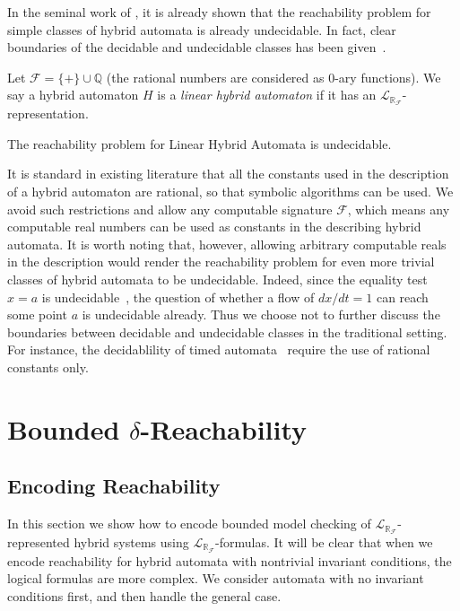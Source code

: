 \documentclass[envcountsect]{llncs}
\newcommand{\lrf}{\mathcal{L}_{\mathbb{R}_{\mathcal{F}}}}
\begin{document}
In the seminal work of \cite{DBLP:conf/rex/AlurD91,DBLP:conf/hybrid/AlurCHH92},
it is already shown that the reachability problem for simple classes of hybrid
automata is already undecidable. In fact, clear boundaries of the decidable and
undecidable classes has been given~\cite{DBLP:journals/jcss/HenzingerKPV98}.
\begin{definition}
Let $\mathcal{F} = \{+\}\cup \mathbb{Q}$ (the rational numbers are considered as
 0-ary functions). We say a hybrid automaton $H$ is a {\em linear hybrid
automaton} if it has an $\lrf$-representation.
\end{definition}

\begin{proposition}
The reachability problem for Linear Hybrid Automata is undecidable.
\end{proposition}
\begin{remark}
It is standard in existing literature that all the constants used in the
description of a hybrid automaton are rational, so that symbolic algorithms can
be used. We avoid such restrictions and allow any
computable signature $\mathcal{F}$, which means  any computable real numbers
can be used as constants in the describing hybrid automata. It is worth noting
that, however, allowing arbitrary computable reals in the description would
render the reachability problem for even more trivial classes of hybrid automata
to be undecidable. Indeed, since the equality test $x=a$ is undecidable~\cite{},
the question of whether a flow of $dx/dt = 1$ can reach some point $a$ is
undecidable already. Thus we choose not to further discuss the boundaries
between decidable and undecidable classes in the traditional setting. For
instance, the decidablility of timed automata~\cite{DBLP:conf/rex/AlurD91}
require the use of rational constants only.
\end{remark}

\section{Bounded $\delta$-Reachability}\label{main}

\subsection{Encoding Reachability}

In this section we show how to encode bounded model checking of
$\lrf$-represented hybrid systems using $\lrf$-formulas. It will be clear that
when we encode reachability for hybrid automata with nontrivial invariant
conditions, the logical formulas are more complex. We consider automata with no
invariant conditions first, and then handle the general case.
\vspace{-.4cm}
\end{document}

